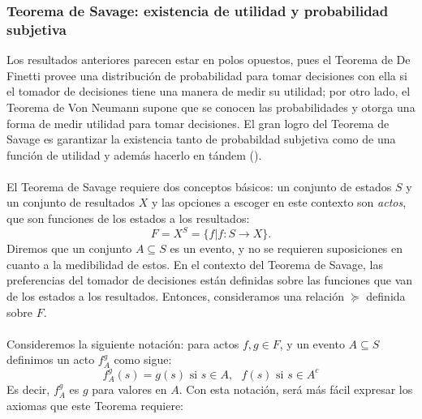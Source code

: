 \documentclass[11pt]{article}
\theoremstyle{plain}
\begin{document}
\subsubsection{Teorema de Savage: existencia de utilidad y probabilidad subjetiva}
Los resultados anteriores parecen estar en polos opuestos, pues el Teorema de De Finetti provee una distribución de probabilidad para tomar decisiones con ella si el tomador de decisiones tiene una manera de medir su utilidad; por otro lado, el Teorema de Von Neumann supone que se conocen las probabilidades y otorga una forma de medir utilidad para tomar decisiones. El gran logro del Teorema de Savage es garantizar la existencia tanto de probabildad subjetiva como de una función de utilidad y además hacerlo en tándem (\cite{gilboa2009decision}).\\
\\
\indent El Teorema de Savage requiere dos conceptos básicos: un conjunto de estados $S$ y un conjunto de resultados $X$ y las opciones a escoger en este contexto son \textit{actos}, que son funciones de los estados a los resultados:
\[ F = X^S = \{ f | f: S \to X \}. \]
\indent Diremos que un conjunto $A \subseteq S$ es un evento, y no se requieren suposiciones en cuanto a la medibilidad de estos. En el contexto del Teorema de Savage, las preferencias del tomador de decisiones están definidas sobre las funciones que van de los estados a los resultados. Entonces, consideramos una relación $\succeq$ definida sobre $F$.\\
\\
\indent Consideremos la siguiente notación: para actos $f,g \in F$, y un evento $A \subseteq S$ definimos un acto $f_A^g$ como sigue:
\[ f_A^g(s)=g(s) \textrm{ si  } s \in A, \textrm{  } f(s) \textrm{ si  } s \in A^c   \]
Es decir, $ f_A^g$ es $g$ para valores en $A$. Con esta notación, será más fácil expresar los axiomas que este Teorema requiere:
\end{document}
